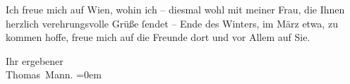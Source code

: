 \pstart
           Ich freue mich auf Wien, wohin ich – diesmal wohl
               mit meiner Frau, die Ihnen
               herzlich verehrungsvolle Grüße{ }ſendet – Ende des Winters, im März etwa,
               zu kommen hoffe, freue mich auf die Freunde dort und vor Allem auf Sie.\pend
           
\pstart
           Ihr ergebener{\\[\baselineskip]}\spacefill\mbox{Thomas Mann.}\pend
           \leftskip=0em{}\endnumbering{}  \newcommand{\dateiname}{L02405}\newcommand{\titel}{Thomas Mann an Arthur Schnitzler, 22. 11. 1923}\newcommand{\editorInnen}{Martin Anton Müller und Gerd-Hermann Susen}
